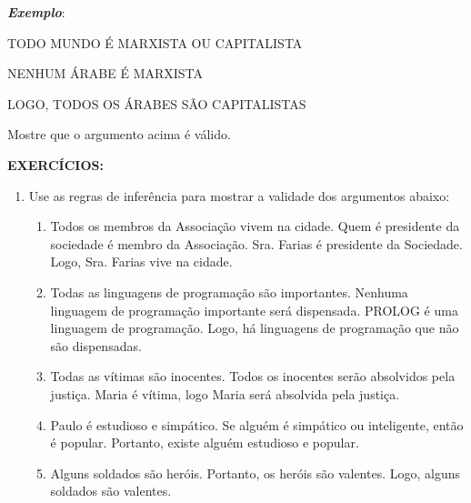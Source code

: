 \noindent \textit{\textbf{Exemplo}}:

TODO MUNDO É MARXISTA OU CAPITALISTA

NENHUM ÁRABE É MARXISTA

LOGO, TODOS OS ÁRABES SÃO CAPITALISTAS

\noindent Mostre que o argumento acima é válido.

\bigskip
\noindent \textbf{EXERCÍCIOS:}
\begin{enumerate}[label=\arabic*)]
    \item Use as regras de inferência para mostrar a validade dos argumentos abaixo:
    \begin{enumerate}[label=\alph*)]
        \item Todos os membros da Associação vivem na cidade. Quem é presidente  da sociedade é membro da Associação. Sra. Farias é presidente da Sociedade. Logo, Sra. Farias vive na cidade.
        \item Todas as linguagens de programação são importantes. Nenhuma linguagem de programação importante será dispensada. PROLOG é uma linguagem de programação. Logo, há linguagens de programação que não são dispensadas.
        \item Todas as vítimas são inocentes. Todos os inocentes serão absolvidos pela justiça. Maria é vítima, logo Maria será absolvida pela justiça.
        \item Paulo é estudioso e simpático. Se alguém é simpático ou inteligente, então é popular. Portanto, existe alguém estudioso e popular.
        \item Alguns soldados são heróis. Portanto, os heróis são valentes. Logo, alguns soldados são valentes.
    \end{enumerate}
\end{enumerate}
